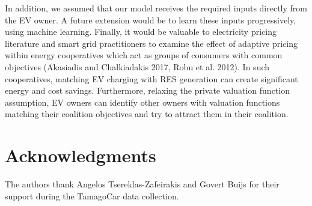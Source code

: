 \documentclass[10pt]{article}
\begin{document}
In addition, we assumed that our model receives the required inputs directly from the EV owner. A future extension would be to learn these inputs progressively, using machine learning. Finally, it would be valuable to electricity pricing literature and smart grid practitioners to examine the effect of adaptive pricing within energy cooperatives which act as groups of consumers with common objectives (Akasiadis and Chalkiadakis 2017, Robu et al. 2012). In such cooperatives, matching EV charging with RES generation can create significant energy and cost savings. Furthermore, relaxing the private valuation function assumption, EV owners can identify other owners with valuation functions matching their coalition objectives and try to attract them in their coalition.

\section*{Acknowledgments}
The authors thank Angelos Tsereklas-Zafeirakis and Govert Buijs for their support during the TamagoCar data collection.
\end{document}
